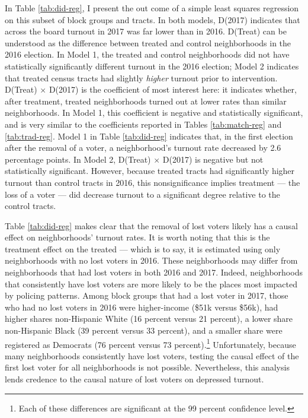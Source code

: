 \documentclass[12pt,]{article}
\let\rmarkdownfootnote\footnote%
\def\footnote{\protect\rmarkdownfootnote}
\begin{document}
In Table \ref{tab:did-reg}, I present the out come of a simple least squares regression on this subset of block groups and tracts. In both models, D(2017) indicates that across the board turnout in 2017 was far lower than in 2016. D(Treat) can be understood as the difference between treated and control neighborhoods in the 2016 election. In Model 1, the treated and control neighborhoods did not have statistically significantly different turnout in the 2016 election; Model 2 indicates that treated census tracts had slightly \emph{higher} turnout prior to intervention. D(Treat) \(\times\) D(2017) is the coefficient of most interest here: it indicates whether, after treatment, treated neighborhoods turned out at lower rates than similar neighborhoods. In Model 1, this coefficient is negative and statistically significant, and is very similar to the coefficients reported in Tables \ref{tab:match-reg} and \ref{tab:trad-reg}. Model 1 in Table \ref{tab:did-reg} indicates that, in the first election after the removal of a voter, a neighborhood's turnout rate decreased by 2.6 percentage points. In Model 2, D(Treat) \(\times\) D(2017) is negative but not statistically significant. However, because treated tracts had significantly higher turnout than control tracts in 2016, this nonsignificance implies treatment --- the loss of a voter --- did decrease turnout to a significant degree relative to the control tracts.



Table \ref{tab:did-reg} makes clear that the removal of lost voters likely has a causal effect on neighborhoods' turnout rates. It is worth noting that this is the treatment effect on the treated --- which is to say, it is estimated using only neighborhoods with no lost voters in 2016. These neighborhoods may differ from neighborhoods that had lost voters in both 2016 and 2017. Indeed, neighborhoods that consistently have lost voters are more likely to be the places most impacted by policing patterns. Among block groups that had a lost voter in 2017, those who had no lost voters in 2016 were higher-income (\$51k versus \$56k), had higher shares non-Hispanic White (16 percent versus 21 percent), a lower share non-Hispanic Black (39 percent versus 33 percent), and a smaller share were registered as Democrats (76 percent versus 73 percent).\footnote{Each of these differences are significant at the 99 percent confidence level.} Unfortunately, because many neighborhoods consistently have lost voters, testing the causal effect of the first lost voter for all neighborhoods is not possible. Nevertheless, this analysis lends credence to the causal nature of lost voters on depressed turnout.
\end{document}

